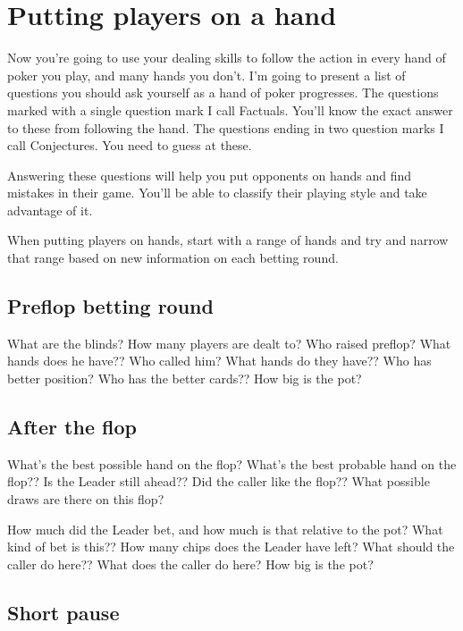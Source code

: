 \chapter{Putting players on a hand}


Now you're going to use your dealing skills to follow the action in
every hand of poker you play, and many hands you don't. I'm going
to present a list of questions you should ask yourself as
a hand of poker progresses. The questions marked with a single question
mark I call Factuals. You'll know the exact answer to these from
following the hand. The questions ending in two question marks I
call Conjectures. You need to guess at these.

Answering these questions will help you put opponents on hands and
find mistakes in their game. You'll be able to classify their
playing style and take advantage of it.

When putting players on hands, start with a range of hands
and try and narrow that range based on new information on each
betting round.

\section{Preflop betting round}

What are the blinds? How many players are dealt to? Who raised preflop?
What hands does he have?? Who called him? What hands do they have??
Who has better position? Who has the better cards?? How big is the pot?

\section{After the flop}

What's the best possible hand on the flop? What's the best probable
hand on the flop?? Is the Leader still ahead?? Did the caller
like the flop?? What possible draws are there on this flop?

How much did the Leader bet, and how much is that relative to the pot?
What kind of bet is this?? How many chips does the Leader have left?
What should the caller do here?? What does the caller do here? How
big is the pot?

\section{Short pause}

